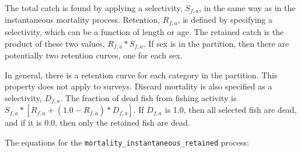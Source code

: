 The total catch is found by applying a selectivity, $S_{f,a}$, in the same way as in the instantaneous mortality process. Retention, $R_{f,a}$, is defined by specifying a selectivity, which can be a function of length or age. The retained catch is the product of these two values, $R_{f,a} * S_{f,a}$. If sex is in the partition, then there are potentially two retention curves, one for each sex.

In general, there is a retention curve for each category in the partition. This property does not apply to surveys. Discard mortality is also specified as a selectivity, $D_{f,a}$. The fraction of dead fish from fishing activity is $S_{f,a} * [ R_{f,a} + (1.0 - R_{f,a}) * D_{f,a} ]$. If $D_{f,a}$ is 1.0, then all selected fish are dead, and if it is 0.0, then only the retained fish are dead.

The equations for the \texttt{mortality\_instantaneous\_retained} process:

